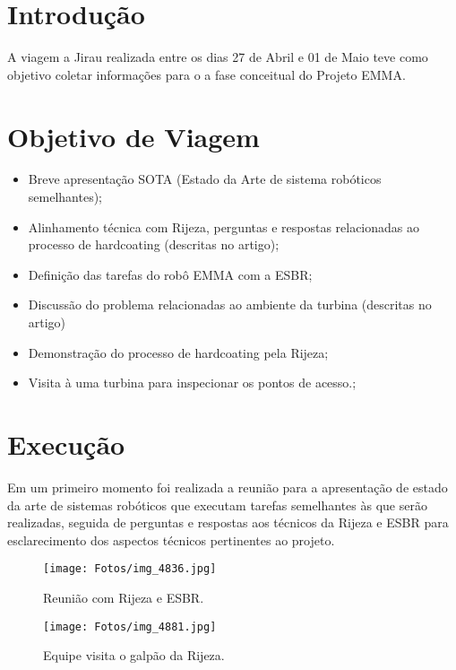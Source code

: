 \documentclass[a4paper,11pt,oneside,openany,brazilian,version=last,draft=false,]{main}
\begin{document}

\begin{twocolumn}




\section{Introdução}
A viagem a Jirau realizada entre os dias 27 de Abril e 01 de Maio teve como
objetivo coletar informações para o a fase conceitual do Projeto EMMA. 

\section{Objetivo de Viagem}
\begin{itemize}
  \item Breve apresentação SOTA (Estado da Arte de sistema robóticos
  seme\-lhantes);
  \item Alinhamento técnica com Rijeza, perguntas e respostas relacionadas ao
  processo de hardcoating (descritas no artigo);
\item Definição das tarefas do robô EMMA com a ESBR;
\item Discussão do problema relacionadas ao ambiente da turbina (descritas no
artigo) 
\item Demonstração do processo de hardcoating pela Rijeza;
\item Visita à uma turbina para inspecionar os pontos de acesso.;
\end{itemize}


\section{Execução}
Em um primeiro momento foi realizada a reunião para a apresentação de estado da
arte de sistemas robóticos que executam tarefas semelhantes às que serão
realizadas, seguida de perguntas e respostas aos técnicos da Rijeza e ESBR para
esclarecimento dos aspectos técnicos pertinentes ao projeto.

\begin{figure}[H]
\centering
\texttt{[image: Fotos/img\_4836.jpg]}
\caption{Reunião com Rijeza e ESBR.}
\label{fig:gull}
\end{figure}
\begin{figure}[H]
\centering
\texttt{[image: Fotos/img\_4881.jpg]}
\caption{Equipe visita o galpão da Rijeza.}
\label{fig:tiger}
\end{figure}


\end{twocolumn}
\end{document}

